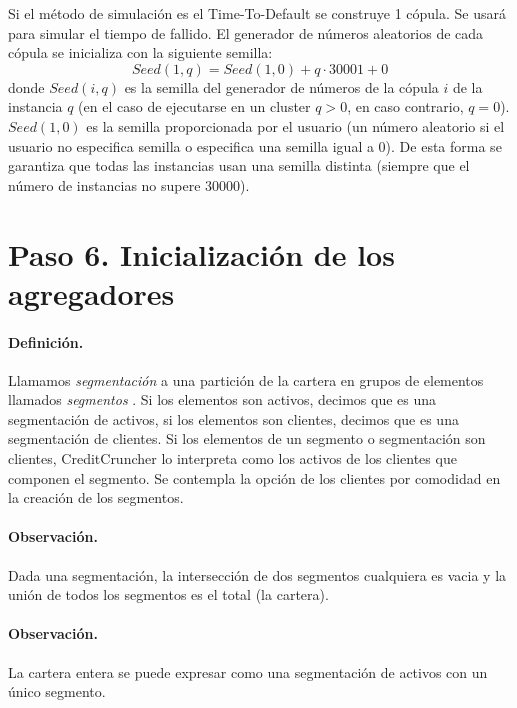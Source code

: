 Si el m\'etodo de simulaci\'on es el Time-To-Default se construye
1 c\'opula. Se usar\'a para simular el tiempo de fallido.
\newline
\newline
El generador de n\'umeros aleatorios de cada c\'opula se
inicializa con la siguiente semilla:
\begin{displaymath}
Seed(1,q) = Seed(1,0) + q \cdot 30001 + 0
\end{displaymath}
donde $Seed(i,q)$ es la semilla del generador de n\'umeros de la
c\'opula $i$ de la instancia $q$ (en el caso de ejecutarse en un
cluster $q>0$, en caso contrario, $q=0$). $Seed(1,0)$ es la semilla
proporcionada por el usuario (un n\'umero aleatorio si el usuario no
especifica semilla o especifica una semilla igual a 0). De esta
forma se garantiza que todas las instancias usan una semilla distinta
(siempre que el n\'umero de instancias no supere 30000).


\section{Paso 6. Inicializaci\'on de los agregadores}

\paragraph{Definici\'on.} Llamamos \emph{segmentaci\'on}
a una partici\'on de la cartera en grupos de elementos llamados \emph{segmentos}
. Si los elementos son activos, decimos que es una segmentaci\'on
de activos, si los elementos son clientes, decimos que es una segmentaci\'on de
clientes. Si los elementos de un segmento o segmentaci\'on son clientes,
CreditCruncher lo interpreta como los activos de los clientes que componen el
segmento. Se contempla la opci\'on de los clientes por comodidad en la
creaci\'on de los segmentos.

\paragraph{Observaci\'on.} Dada una segmentaci\'on, la intersecci\'on
de dos segmentos cualquiera es vacia y la uni\'on de todos los
segmentos es el total (la cartera).

\paragraph{Observaci\'on.} La cartera entera se puede expresar como una
segmentaci\'on de activos con un \'unico segmento.

